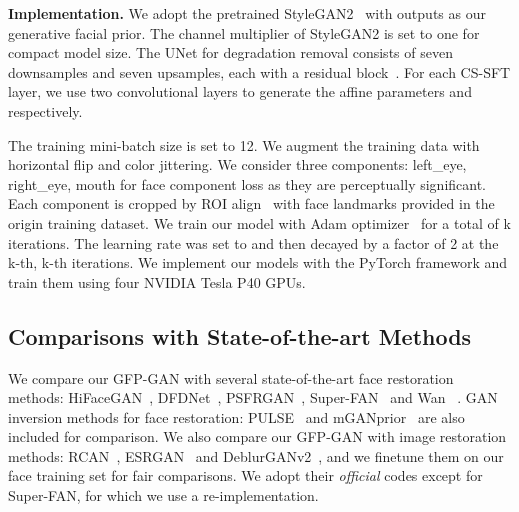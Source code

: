 \documentclass[final]{cvpr}
\begin{document}
\noindent\textbf{Implementation.}
We adopt the pretrained StyleGAN2~\cite{karras2020stylegan2} with  outputs as our generative facial prior.
The channel multiplier of StyleGAN2 is set to one for compact model size. 
The UNet for degradation removal consists of seven downsamples and seven upsamples, each with a residual block~\cite{he2016resnet}. For each CS-SFT layer, we use two convolutional layers to generate the affine parameters  and  respectively.


The training mini-batch size is set to 12. We augment the training data with horizontal flip and color jittering.
We consider three components: left\_eye, right\_eye, mouth for face component loss as they are perceptually significant. 
Each component is cropped by ROI align~\cite{he2017maskrcnn} with face landmarks provided in the origin training dataset.
We train our model with Adam optimizer~\cite{kingma2014adam} for a total of k iterations.
The learning rate was set to  and then decayed by a
factor of 2 at the k-th, k-th iterations.
We implement our models with the PyTorch framework and train them using four
NVIDIA Tesla P40 GPUs.



\subsection{Comparisons with State-of-the-art Methods}
We compare our GFP-GAN with several state-of-the-art face restoration methods:  HiFaceGAN~\cite{yang2020hifacegan}, DFDNet~\cite{li2020dfdnet}, PSFRGAN~\cite{chen2020psfrgan}, Super-FAN~\cite{bulat2018super} and Wan \etal~\cite{wan2020bringing}. 
GAN inversion methods for face restoration: PULSE~\cite{menon2020pulse} and mGANprior~\cite{gu2020mGANprior} are also included for comparison. 
We also compare our GFP-GAN with image restoration methods: RCAN~\cite{zhang2018rcan}, ESRGAN~\cite{wang2018esrgan} and DeblurGANv2~\cite{kupyn2019deblurganv2}, and we finetune them on our face training set for fair comparisons.
We adopt their \textit{official} codes except for Super-FAN, for which we use a re-implementation.
\end{document}
